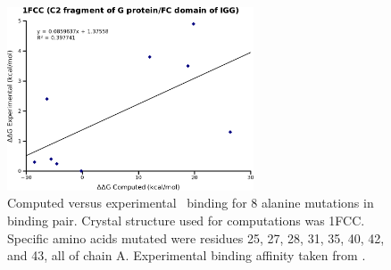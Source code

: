 \begin{figure}[h]
    \centering
    \includegraphics[width=0.65\textwidth]{figures/1fcc.png}
    \caption{Computed versus experimental \ddg\ binding for 8 alanine mutations in  binding pair.
    Crystal structure used for computations was 1FCC.
    Specific amino acids mutated were residues 25, 27, 28, 31, 35, 40, 42, and 43, all of chain A.
    Experimental binding affinity taken from \protect\cite{thorn2001asedb}.}
    \label{figure:computational_mutation_scanning/1FCC_ddg}
\end{figure}

